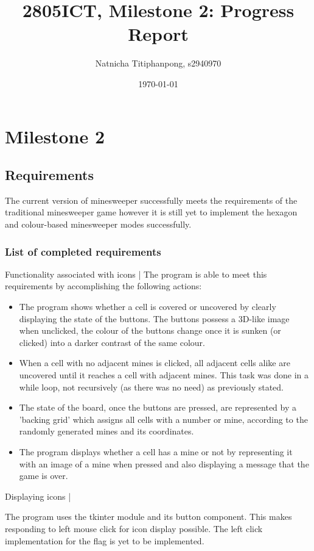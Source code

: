 \documentclass[12pt, a4]{report}
\title{2805ICT, Milestone 2: Progress Report}
\author{Natnicha Titiphanpong, s2940970}%
\date{\today}
\begin{document}
	
	\begin{titlepage}
		\maketitle
	\end{titlepage}
	\tableofcontents
	\pagebreak
	\section{Milestone 2}
	\subsection{Requirements}
	\par The current  version of minesweeper successfully meets the requirements of the traditional minesweeper game however it is still yet to implement the hexagon and colour-based minesweeper  modes successfully. 
		\subsubsection{List of completed requirements}
		Functionality associated with icons |
		The program is able to meet this requirements by accomplishing the following actions:
		\begin{itemize}
			\item The program shows whether a cell is covered or uncovered by clearly displaying the state of the buttons. The buttons possess a 3D-like image when unclicked, the colour of the buttons change once it is sunken (or clicked) into a darker contrast of the same colour. 
			\item When a cell with no adjacent mines is clicked, all adjacent cells alike are uncovered until it reaches a cell with adjacent mines. This task was done in a while loop, not recursively (as there was no need) as previously stated. 
			\item The state of the board, once the buttons are pressed, are represented by a 'backing grid' which assigns all cells with a number or mine, according to the randomly generated mines and its coordinates.
			\item The program displays whether a cell has a mine or not by representing it with an image of a mine when pressed and also displaying a message that the game is over.
		\end{itemize}
		
		Displaying icons |
		\par The program uses the tkinter module and its button component. This makes responding to left mouse click for icon display possible. The left click implementation for the flag is yet to be implemented. 
		
\end{document}
